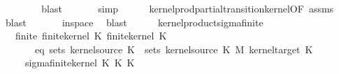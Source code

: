 \begin{isabellebody}
\ \ \ \ \isamarkupfalse%
\ {}\ \isamarkupfalse%
\ blast\isanewline
\ \ \ \ \ \isamarkupfalse%
\ simp\isanewline
\ \ \ \ \isamarkupfalse%
\ kernel{\isacharunderscore}{\kern0pt}prod{\isacharunderscore}{\kern0pt}partial{\isacharunderscore}{\kern0pt}transition{\isacharunderscore}{\kern0pt}kernel{\isacharbrackleft}{\kern0pt}OF\ assms{\isacharparenleft}{\kern0pt}{}{\isacharminus}{\kern0pt}{}{\isacharparenright}{\kern0pt}{\isacharbrackright}{\kern0pt}\ \isamarkupfalse%
\ blast\isanewline
\ \ \ \ \isamarkupfalse%
\ {}\ in{\isacharunderscore}{\kern0pt}space\ \isamarkupfalse%
\ blast\isanewline
\ \ \ \ \isamarkupfalse%
\isanewline
{}\isamarkupfalse%
%
\endisatagproof
{\isafoldproof}%
%
\isadelimproof
\isanewline
%
\endisadelimproof
\isanewline
{}\isamarkupfalse%
\ kernel{\isacharunderscore}{\kern0pt}product{\isacharunderscore}{\kern0pt}sigma{\isacharunderscore}{\kern0pt}finite{\isacharcolon}{\kern0pt}\isanewline
\ \ \ finite{\isacharcolon}{\kern0pt}\ {\isachardoublequoteopen}finite{\isacharunderscore}{\kern0pt}kernel\ K{\isacharunderscore}{\kern0pt}{}{\isachardoublequoteclose}\ {\isachardoublequoteopen}finite{\isacharunderscore}{\kern0pt}kernel\ K{\isacharunderscore}{\kern0pt}{}{\isachardoublequoteclose}\isanewline
\ \ \ \ \ \ \ eq{\isacharcolon}{\kern0pt}\ {\isachardoublequoteopen}sets\ {\isacharparenleft}{\kern0pt}kernel{\isacharunderscore}{\kern0pt}source\ K{\isacharunderscore}{\kern0pt}{}{\isacharparenright}{\kern0pt}\ {\isacharequal}{\kern0pt}\ sets\ {\isacharparenleft}{\kern0pt}kernel{\isacharunderscore}{\kern0pt}source\ K{\isacharunderscore}{\kern0pt}{}\ {\isasymOtimes}\isactrlsub M\ kernel{\isacharunderscore}{\kern0pt}target\ K{\isacharunderscore}{\kern0pt}{}{\isacharparenright}{\kern0pt}{\isachardoublequoteclose}\isanewline
\ \ \ \ \ {\isachardoublequoteopen}sigma{\isacharunderscore}{\kern0pt}finite{\isacharunderscore}{\kern0pt}kernel\ {\isacharparenleft}{\kern0pt}K{\isacharunderscore}{\kern0pt}{}\ {\isasymOtimes}\isactrlsub K\ K{\isacharunderscore}{\kern0pt}{}{\isacharparenright}{\kern0pt}{\isachardoublequoteclose}\isanewline
%
\isadelimproof
%
\endisadelimproof
%
\isatagproof
{}\isamarkupfalse%
\ {\isacharminus}{\kern0pt}\isanewline
\ \ \isacommand{{\isacharbraceleft}{\kern0pt}}\isamarkupfalse%

\end{isabellebody}
